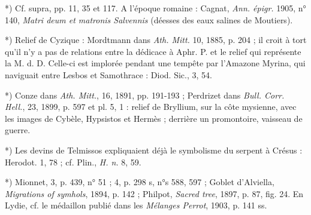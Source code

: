 \documentclass[a4paper, 11pt, oneside, polutonikogreek, french]{article}
\begin{document}
*) Cf. supra, pp. 11, 35 et 117. A l'époque romaine : Cagnat, \emph{Ann. épigr.} 1905, n° 140, \emph{Matri deum et matronis Salvennis} (déesses des eaux salines de Moutiers).

*) Relief de Cyzique : Mordtmann dans \emph{Ath. Mitt.} 10, 1885, p. 204 ; il croit à tort qu'il n'y a pas de relations entre la dédicace à Aphr. P. et le relief qui représente la M. d. D. Celle-ci est implorée pendant une tempête par l'Amazone Myrina, qui naviguait entre Lesbos et Samothrace : Diod. Sic., 3, 54.

*) Conze dans \emph{Ath. Mitt.}, 16, 1891, pp. 191-193 ; Perdrizet dans \emph{Bull. Corr. Hell.}, 23, 1899, p. 597 et pl. 5, 1 : relief de Bryllium, sur la côte mysienne, avec les images de Cybèle, Hypsistos et Hermès ; derrière un promontoire, vaisseau de guerre.

*) Les devins de Telmissos expliquaient déjà le symbolisme du serpent à Crésus : Herodot. 1, 78 ; cf. Plin., \emph{H. n.} 8, 59.

*) Mionnet, 3, p. 439, n° 51 ; 4, p. 298 s, n°s 588, 597 ; Goblet d'Alviella, \emph{Migrations of symhols}, 1894, p. 142 ; Philpot, \emph{Sacred tree}, 1897, p. 87, fig. 24. En Lydie, cf. le médaillon publié dans les \emph{Mélanges Perrot}, 1903, p. 141 ss.
\end{document}
